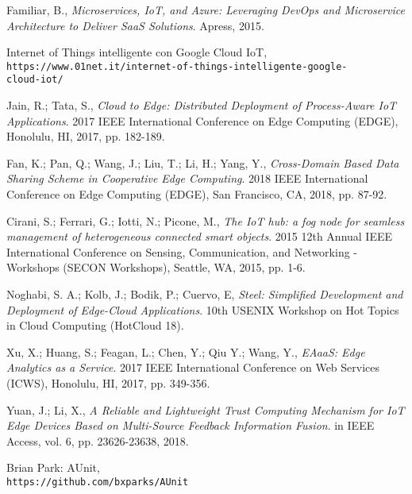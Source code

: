 \documentclass[a4paper,12pt,oneside]{book}
\begin{document}
\begin{thebibliography}{9}
	Familiar, B., 
	\textit{Microservices, IoT, and Azure: Leveraging DevOps and Microservice Architecture to Deliver SaaS Solutions}. 
	Apress, 2015.
	
	Internet of Things intelligente con Google Cloud IoT,
	\\\texttt{https://www.01net.it/internet-of-things-intelligente-google-\\cloud-iot/}
	
	Jain, R.; Tata, S., 
	\textit{Cloud to Edge: Distributed Deployment of Process-Aware IoT Applications}. 
	2017 IEEE International Conference on Edge Computing (EDGE), Honolulu, HI, 2017, pp. 182-189.
	
	Fan, K.; Pan, Q.; Wang, J.; Liu, T.; Li, H.; Yang, Y., 
	\textit{Cross-Domain Based Data Sharing Scheme in Cooperative Edge Computing}. 
	2018 IEEE International Conference on Edge Computing (EDGE), San Francisco, CA, 2018, pp. 87-92.
	
	Cirani, S.; Ferrari, G.; Iotti, N.; Picone, M., 
	\textit{The IoT hub: a fog node for seamless management of heterogeneous connected smart objects}. 
	2015 12th Annual IEEE International Conference on Sensing, Communication, and Networking - Workshops (SECON Workshops), Seattle, WA, 2015, pp. 1-6.
	
	Noghabi, S. A.; Kolb, J.; Bodik, P.; Cuervo, E, 
	\textit{Steel: Simplified Development and Deployment of Edge-Cloud Applications}. 
	10th {USENIX} Workshop on Hot Topics in Cloud Computing (HotCloud 18).
	
	Xu, X.; Huang, S.; Feagan, L.; Chen, Y.; Qiu Y.; Wang, Y., 
	\textit{EAaaS: Edge Analytics as a Service}.
	2017 IEEE International Conference on Web Services (ICWS), Honolulu, HI, 2017, pp. 349-356.
	
	Yuan, J.; Li, X., 
	\textit{A Reliable and Lightweight Trust Computing Mechanism for IoT Edge Devices Based on Multi-Source Feedback Information Fusion}. 
	in IEEE Access, vol. 6, pp. 23626-23638, 2018.
	
	Brian Park: AUnit,
	\\\texttt{https://github.com/bxparks/AUnit}
	
	
\end{thebibliography}
\end{document}
